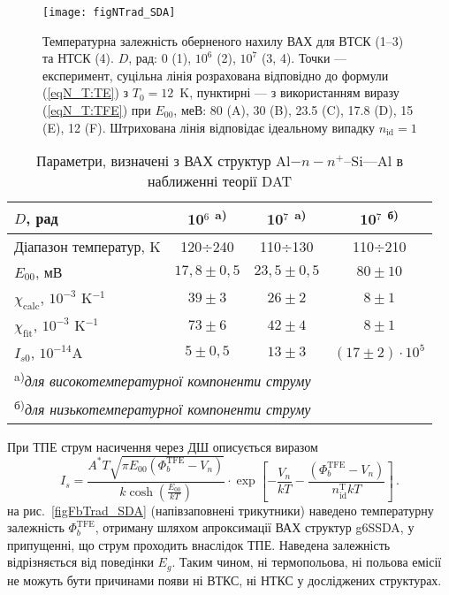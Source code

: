 \begin{figure}
\center
\texttt{[image: figNTrad\_SDA]}
\caption{\label{figNTrad_SDA}
Температурна залежність оберненого нахилу ВАХ для ВТСК (1--3)
та НТСК (4).
$D$, рад: $0$ (1), $10^6$ (2), $10^7$ (3, 4).
Точки --- експеримент,
суцільна лінія розрахована відповідно до формули (\ref{eqN_T:TE}) з $T_0=12$~K,
пунктирні --- з використанням виразу (\ref{eqN_T:TFE}) при
$E_{00}$, меВ: 80 (A), 30 (B), 23.5 (C), 17.8 (D), 15 (E), 12 (F).
Штрихована лінія відповідає ідеальному випадку $n_{\mathrm{id}}=1$
}%
\end{figure}


\begin{table}
\caption{Параметри, визначені з ВАХ структур Al$-n-n^+$--Si---Al в наближенні теорії DAT}
\label{tabSDAParRad:DAT}
\centering
\begin{tabular}{|l|c|c|c|}
\hline
$D$, рад &10$^6$ \textsuperscript{ a)}&10$^7$ \textsuperscript{ a)}&10$^7$ \textsuperscript{ б)}\\ \hline
Діапазон температур, K&120$\div$240&110$\div$130&110$\div$210\\
$E_{00}$, мВ&$17,8\pm0,5$&$23,5\pm0,5$&$80\pm10$\\
$\chi_\mathrm{calc}$, $10^{-3}$ K$^{-1}$&$39\pm3$&$26\pm2$&$8\pm1$\\
$\chi_\mathrm{fit}$, $10^{-3}$ K$^{-1}$&$73\pm6$&$42\pm4$&$8\pm1$\\
$I_{s0}$, $10^{-14}$A&$5\pm0,5$&$13\pm3$&$(17\pm2)\cdot10^{5}$\\
\hline
\multicolumn{4}{l}{\textsuperscript{ a)}\emph{для високотемпературної компоненти струму}}\\
\multicolumn{4}{l}{\textsuperscript{ б)}\emph{для низькотемпературної компоненти струму}}\\
\end{tabular}
\end{table}

При ТПЕ струм насичення через ДШ описується виразом \cite{Rhoderick1988, Roul}
\begin{equation}\label{eqIs:TFE}
  I_s=\frac{A^*T\sqrt{\pi{E_{00}}(\Phi_b^\mathrm{TFE}-V_n)}}{k\cosh\left(\frac{E_{00}}{kT}\right)}\cdot
  \exp\left[-\frac{V_n}{kT}-\frac{(\Phi_b^\mathrm{TFE}-V_n)}{n_{\mathrm{id}}^\mathrm{T}kT}\right]\,.
\end{equation}
на рис.~\ref{figFbTrad_SDA} (напівзаповнені трикутники) наведено температурну залежність $\Phi_b^\mathrm{TFE}$, отриману шляхом апроксимації ВАХ структур g6SSDA,
у припущенні, що струм проходить внаслідок ТПЕ.
Наведена залежність відрізняється від поведінки $E_g$.
Таким чином, ні термопольова, ні польова емісії не можуть бути причинами появи ні ВТКС, ні НТКС у досліджених структурах.

